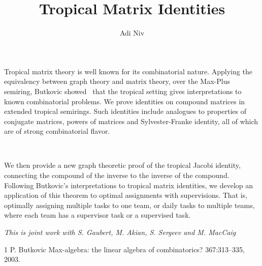 \documentclass[a4paper]{amsart}
\date{}
\begin{document}
\title{Tropical Matrix Identities}
\author{Adi Niv} %
\address{Kibbutzim College} %

\maketitle


Tropical matrix theory is well known for its combinatorial nature. Applying the equivalency between graph theory and matrix theory, over the Max-Plus semiring, Butkovic showed~\cite{But03} that the tropical setting gives interpretations to known combinatorial problems. We prove identities on compound matrices in extended tropical semirings. Such identities include analogues to properties of conjugate matrices, powers of matrices and Sylvester-Franke identity, all of which are of strong combinatorial flavor. 

\ 

We then provide a new graph theoretic proof of the tropical Jacobi identity, connecting the compound of the inverse to the inverse of the compound. Following Butkovic's interpretations to tropical matrix identities, we develop an application of this theorem to optimal assignments with supervisions. That is, optimally assigning multiple tasks to one team, or daily tasks to multiple teams, where each team has a supervisor task or a supervised task.




\emph{This is joint work with S. Gaubert, M. Akian, S. Sergeev and M. MacCaig}

\begin{thebibliography}{1}
P. Butkovic
\newblock Max-algebra: the linear algebra of combinatorics? 
 367:313–335, 2003.


\end{thebibliography}
\end{document}
